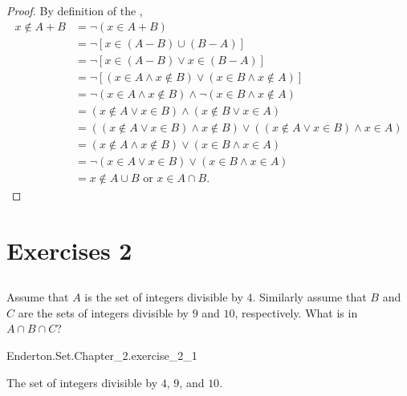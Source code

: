 \documentclass{report}
\begin{document}
  \begin{proof}
    By definition of the ,
      \begin{align*}
        x \not\in A + B
          & = \neg(x \in A + B) \\
          & = \neg[x \in (A - B) \cup (B - A)] \\
          & = \neg[x \in (A - B) \lor x \in (B - A)] \\
          & = \neg[(x \in A \land x \not\in B) \lor
            (x \in B \land x \not\in A)] \\
          & = \neg(x \in A \land x \not\in B) \land
            \neg(x \in B \land x \not\in A) \\
          & = (x \not\in A \lor x \in B) \land (x \not\in B \lor x \in A) \\
          & = ((x \not\in A \lor x \in B) \land x \not\in B) \lor
            ((x \not\in A \lor x \in B) \land x \in A) \\
          & = (x \not\in A \land x \not\in B) \lor (x \in B \land x \in A) \\
          & = \neg(x \in A \lor x \in B) \lor (x \in B \land x \in A) \\
          & = x \not\in A \cup B \text{ or } x \in A \cap B.
      \end{align*}
  \end{proof}

\section{Exercises 2}%

\subsection{}%

  Assume that $A$ is the set of integers divisible by $4$.
  Similarly assume that $B$ and $C$ are the sets of integers divisible by $9$ and
    $10$, respectively.
  What is in $A \cap B \cap C$?

    {Enderton.Set.Chapter\_2.exercise\_2\_1}

  \begin{answer}
    The set of integers divisible by $4$, $9$, and $10$.
  \end{answer}

\subsection{}%
\end{document}
